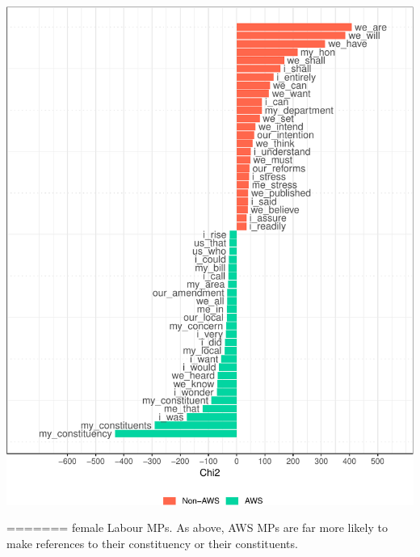 \documentclass[]{article}
\let\origfigure\figure
\let\endorigfigure\endfigure
\renewenvironment{figure}[1][2] {
    \expandafter\origfigure\expandafter[H]
} {
    \endorigfigure
}
\theoremstyle{definition}
\theoremstyle{definition}
\theoremstyle{definition}
\theoremstyle{remark}
\begin{document}
\begin{table}[H]
\begin{table}[H]
\begin{table}[H]
\begin{table}[H]
\begin{table}[H]
\begin{table}[H]
\begin{table}[H]
\begin{table}[H]
\begin{figure}
\centering
\includegraphics{methodology_files/figure-latex/bigrams-sl-keyness-1.pdf}
\caption{\label{fig:bigrams-sl-keyness}Bigram Keyness in Female Labour MPs
by Selection Process}
=======
female Labour MPs. As above, AWS MPs are far more likely to make
references to their constituency or their constituents.


\end{figure}
\end{table}
\end{table}
\end{table}
\end{table}
\end{table}
\end{table}
\end{table}
\end{table}
\end{document}
